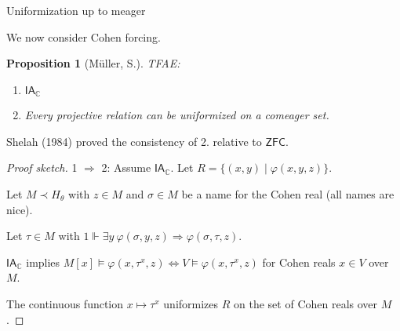 \documentclass[handout, dvipsnames, usenames, 9pt, serif]{beamer}
\newtheorem{proposition}{Proposition}
\newcommand{\CC}{\mathbb{C}}
\newcommand{\IA}{\mathsf{IA}}
\newcommand{\cb}{\color{blue}}
\begin{document}
\fi 



\begin{frame}{Uniformization up to meager} 

\medskip 
We now consider Cohen forcing. 

\medskip 
\begin{proposition}[M\"uller, S.] 
TFAE: 
\begin{enumerate} 
\item[1.]  
$\IA_\CC$ 
\item[2.] 
Every projective relation can be uniformized on a {\cb comeager set}. 
\end{enumerate} 
\end{proposition} 
\pause  

\medskip 
Shelah (1984) proved the consistency of {\cb 2.} relative to $\mathsf{ZFC}$. 
\pause  

\medskip 
\begin{proof}[Proof sketch] 
{\color{blue} 1 $\Rightarrow$ 2: }  
Assume $\IA_\CC$. Let $R=\{(x,y)\mid \varphi(x,y,z)\}$. 

\medskip 
Let $M\prec H_\theta$ with $z\in M$ and $\sigma\in M$ be a name for the Cohen real (all names are nice). 

\medskip 
Let $\tau\in M$ with $1\Vdash \exists y\ \varphi(\sigma,y,z)\Rightarrow \varphi(\sigma,\tau,z)$. 

\medskip 
$\IA_\CC$ implies $M[x]\models \varphi(x,\tau^x,z) \Longleftrightarrow V\models \varphi(x,\tau^x,z)$ for Cohen reals $x\in V$ over $M$. 

\medskip 
The continuous function $x\mapsto \tau^x$ uniformizes $R$ on the set of Cohen reals over $M$. 
\end{proof} 

\end{frame}
\end{document}
